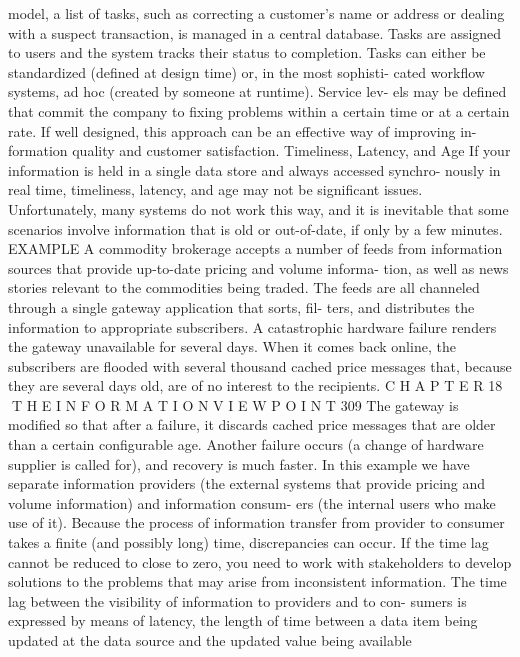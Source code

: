 model, a list of tasks, such as correcting a customer’s name or address or
dealing with a suspect transaction, is managed in a central database. Tasks
are assigned to users and the system tracks their status to completion. Tasks
can either be standardized (defined at design time) or, in the most sophisti-
cated workflow systems, ad hoc (created by someone at runtime). Service lev-
els may be defined that commit the company to fixing problems within a
certain time or at a certain rate.
If well designed, this approach can be an effective way of improving in-
formation quality and customer satisfaction.
Timeliness, Latency, and Age
If your information is held in a single data store and always accessed synchro-
nously in real time, timeliness, latency, and age may not be significant issues.
Unfortunately, many systems do not work this way, and it is inevitable that
some scenarios involve information that is old or out-of-date, if only by a few
minutes.
EXAMPLE A commodity brokerage accepts a number of feeds from
information sources that provide up-to-date pricing and volume informa-
tion, as well as news stories relevant to the commodities being traded. The
feeds are all channeled through a single gateway application that sorts, fil-
ters, and distributes the information to appropriate subscribers.
A catastrophic hardware failure renders the gateway unavailable for
several days. When it comes back online, the subscribers are flooded
with several thousand cached price messages that, because they are
several days old, are of no interest to the recipients.
C H A P T E R 18  T H E I N F O R M A T I O N V I E W P O I N T
 309
The gateway is modified so that after a failure, it discards cached
price messages that are older than a certain configurable age. Another
failure occurs (a change of hardware supplier is called for), and recovery
is much faster.
In this example we have separate information providers (the external
systems that provide pricing and volume information) and information consum-
ers (the internal users who make use of it). Because the process of information
transfer from provider to consumer takes a finite (and possibly long) time,
discrepancies can occur. If the time lag cannot be reduced to close to zero, you
need to work with stakeholders to develop solutions to the problems that may
arise from inconsistent information.
The time lag between the visibility of information to providers and to con-
sumers is expressed by means of latency, the length of time between a data
item being updated at the data source and the updated value being available
